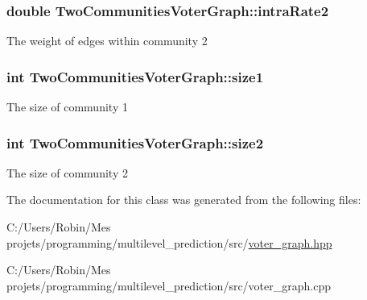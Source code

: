 \subsubsection[{intra\+Rate2}]{\setlength{\rightskip}{0pt plus 5cm}double Two\+Communities\+Voter\+Graph\+::intra\+Rate2}\label{class_two_communities_voter_graph_a6e7ea06e014d75b7bf18441885e07e1e}
The weight of edges within community 2 \hypertarget{class_two_communities_voter_graph_a3c9db0ac7e58d875ab3ce277bf74b284}{}
\subsubsection[{size1}]{\setlength{\rightskip}{0pt plus 5cm}int Two\+Communities\+Voter\+Graph\+::size1}\label{class_two_communities_voter_graph_a3c9db0ac7e58d875ab3ce277bf74b284}
The size of community 1 \hypertarget{class_two_communities_voter_graph_a8b88457f020773b984e0d8c85d9ee502}{}
\subsubsection[{size2}]{\setlength{\rightskip}{0pt plus 5cm}int Two\+Communities\+Voter\+Graph\+::size2}\label{class_two_communities_voter_graph_a8b88457f020773b984e0d8c85d9ee502}
The size of community 2 

The documentation for this class was generated from the following files\+:\begin{DoxyCompactItemize}
\item 
C\+:/\+Users/\+Robin/\+Mes projets/programming/multilevel\+\_\+prediction/src/\hyperlink{voter__graph_8hpp}{voter\+\_\+graph.\+hpp}\item 
C\+:/\+Users/\+Robin/\+Mes projets/programming/multilevel\+\_\+prediction/src/voter\+\_\+graph.\+cpp\end{DoxyCompactItemize}
